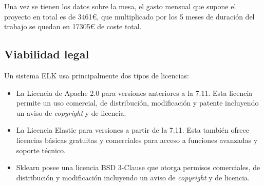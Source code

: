 Una vez se tienen los datos sobre la mesa, el gasto mensual que supone el proyecto en total es de 3461€, que multiplicado por los 5 meses de duración del trabajo se quedan en 17305€ de coste total.

\subsection{Viabilidad legal}
Un sistema ELK usa principalmente dos tipos de licencias: 
\begin{itemize}
    \item La Licencia de Apache 2.0 para versiones anteriores a la 7.11. Esta licencia permite un uso comercial, de distribución, modificación y patente incluyendo un aviso de \textit{copyright} y de licencia.
    \item La Licencia Elastic para versiones a partir de la 7.11. Esta también ofrece licencias básicas gratuitas y comerciales para acceso a funciones avanzadas y soporte técnico.
    \item Sklearn posee una licencia BSD 3-Clause que otorga permisos comerciales, de distribución y modificación incluyendo un aviso de \textit{copyright} y de licencia.
\end{itemize}

